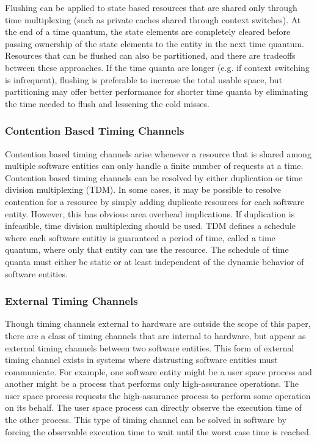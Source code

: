 Flushing can be applied to state based resources that are shared only through 
time multiplexing (such as private caches shared through context switches).  At 
the end of a time quantum, the state elements are completely cleared before 
passing ownership of the state elements to the entity in the next time quantum.  
Resources that can be flushed can also be partitioned, and there are tradeoffs 
between these approaches.
If the time quanta are longer (e.g. if context switching is infrequent), 
flushing is preferable to increase the total usable space, but partitioning may 
offer better performance for shorter time quanta by eliminating the time needed 
to flush and lessening the cold misses.

\subsubsection{Contention Based Timing Channels}
Contention based timing channels arise whenever a resource that is shared among 
multiple software entities can only handle a finite number of requests at a 
time. Contention based timing channels can be resolved by either duplication or 
time division multiplexing (TDM). In some cases, it may be possible to resolve 
contention for a resource by simply adding duplicate resources for each 
software entity. However, this has obvious area overhead implications. If 
duplication is infeasible, time division multiplexing should be used. TDM 
defines a schedule where each software entitiy is guaranteed a period of time, 
called a time quantum, where only that entity can use the resource. The 
schedule of time quanta must either be static or at least independent of the 
dynamic behavior of software entities.

\subsubsection{External Timing Channels}
Though timing channels external to hardware are outside the scope of this 
paper, there are a class of timing channels that are internal to hardware, but 
appear as external timing channels between two software entities. This form of 
external timing channel exists in systems where distrusting software entities 
must communicate. For example, one software entity might be a user space 
process and another might be a process that performs only high-assurance 
operations. The user space process requests the high-assurance process to 
perform some operation on its behalf. The user space process can directly 
observe the execution time of the other process. This type of timing channel 
can be solved in software by forcing the observable execution time to wait 
until the worst case time is reached.

